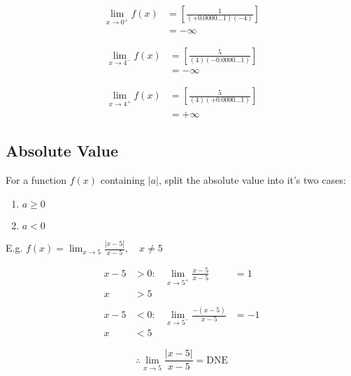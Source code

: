 \documentclass{article}
\begin{document}
\begin{align*}
    \lim_{x \to 0^{+}} f(x) & = \left[ \frac{1}{(+0.0000\ldots1)(-4)} \right] \\
                            & = -\infty
\end{align*}

\begin{align*}
    \lim_{x \to 4^{-}} f(x) & = \left[ \frac{5}{(4)(-0.0000\ldots1)} \right] \\
                            & = -\infty
\end{align*}

\begin{align*}
    \lim_{x \to 4^{+}} f(x) & = \left[ \frac{5}{(4)(+0.0000\ldots1)} \right] \\
                            & = +\infty
\end{align*}

\subsection{Absolute Value}
For a function $f(x)$ containing $|a|$, split the absolute value into it's two cases:

\begin{enumerate}
    \item $a \geq 0$
    \item $a < 0$
\end{enumerate}

\bigskip

\noindent E.g. $f(x) = \displaystyle \lim_{x \to 5} \frac{|x-5|}{x-5}, \quad x\neq5$

\begin{align*}
    x-5 & > 0: & \lim_{x \to 5^{+}} \frac{x-5}{x-5}    & = 1  \\
    x   & > 5                                                 \\\\
    x-5 & < 0: & \lim_{x \to 5^{-}} \frac{-(x-5)}{x-5} & = -1 \\
    x   & < 5
\end{align*}

\begin{equation*}
    \therefore \lim_{x \to 5} \frac{|x-5|}{x-5} = \text{DNE}
\end{equation*}
\end{document}

